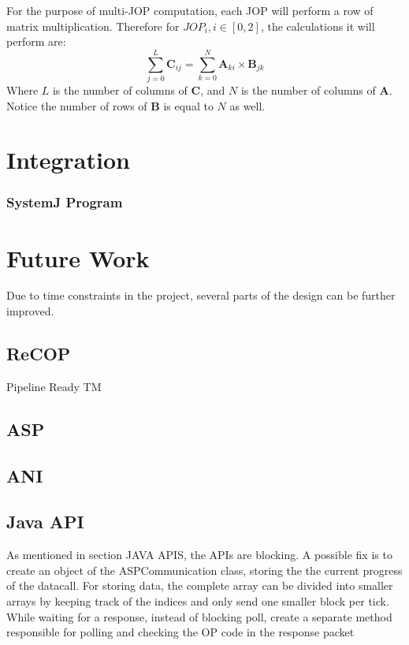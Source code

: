 \documentclass[]{article}
\begin{document}
	For the purpose of multi-JOP computation, each JOP will perform a row of matrix multiplication. Therefore for $JOP_i, i \in [0,2]$, the calculations it will perform are:
	\begin{equation}
	\sum\limits_{j=0}^{L}\textbf{C}_{ij} = \sum\limits_{k=0}^{N} \textbf{A}_{ki} \times \textbf{B}_{jk}
	\end{equation}
	Where $L$ is the number of columns of $\textbf{C}$, and $N$ is the number of columns of $\textbf{A}$. Notice the number of rows of $\textbf{B}$ is equal to $N$ as well.
	\section{Integration}
	
	\subsubsection{SystemJ Program}
	
	
	
	\section{Future Work} \label{sec:future_work}
	Due to time constraints in the project, several parts of the design can be further improved.
	
	\subsection{ReCOP}
	Pipeline Ready TM
	
	\subsection{ASP}
	
	
	\subsection{ANI}
	
	
	\subsection{Java API}
	As mentioned in section JAVA APIS, the APIs are blocking. A possible fix is to create an object of the ASPCommunication class, storing the the current progress of the datacall. For storing data, the complete array can be divided into smaller arrays by keeping track of the indices and only send one smaller block per tick. While waiting for a response, instead of blocking poll, create a separate method responsible for polling and checking the OP code in the response packet
	
\end{document}
